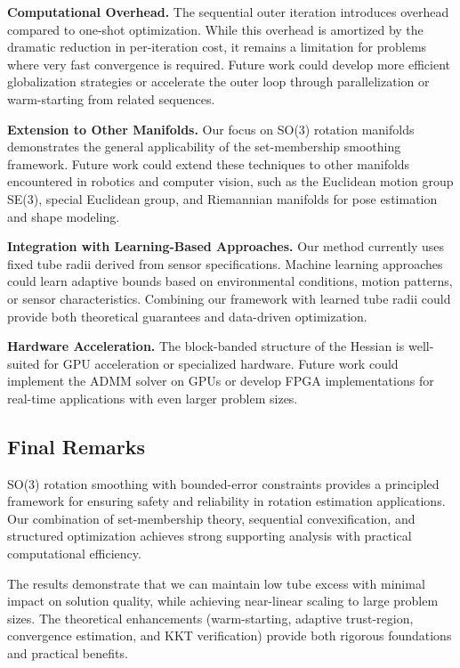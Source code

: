 \textbf{Computational Overhead.} The sequential outer iteration introduces overhead compared to one-shot optimization. While this overhead is amortized by the dramatic reduction in per-iteration cost, it remains a limitation for problems where very fast convergence is required. Future work could develop more efficient globalization strategies or accelerate the outer loop through parallelization or warm-starting from related sequences.

\textbf{Extension to Other Manifolds.} Our focus on SO(3) rotation manifolds demonstrates the general applicability of the set-membership smoothing framework. Future work could extend these techniques to other manifolds encountered in robotics and computer vision, such as the Euclidean motion group SE(3), special Euclidean group, and Riemannian manifolds for pose estimation and shape modeling.

\textbf{Integration with Learning-Based Approaches.} Our method currently uses fixed tube radii derived from sensor specifications. Machine learning approaches could learn adaptive bounds based on environmental conditions, motion patterns, or sensor characteristics. Combining our framework with learned tube radii could provide both theoretical guarantees and data-driven optimization.

\textbf{Hardware Acceleration.} The block-banded structure of the Hessian is well-suited for GPU acceleration or specialized hardware. Future work could implement the ADMM solver on GPUs or develop FPGA implementations for real-time applications with even larger problem sizes.

\subsection{Final Remarks}

SO(3) rotation smoothing with bounded-error constraints provides a principled framework for ensuring safety and reliability in rotation estimation applications. Our combination of set-membership theory, sequential convexification, and structured optimization achieves strong supporting analysis with practical computational efficiency.

The results demonstrate that we can maintain low tube excess with minimal impact on solution quality, while achieving near-linear scaling to large problem sizes. The theoretical enhancements (warm-starting, adaptive trust-region, convergence estimation, and KKT verification) provide both rigorous foundations and practical benefits.

